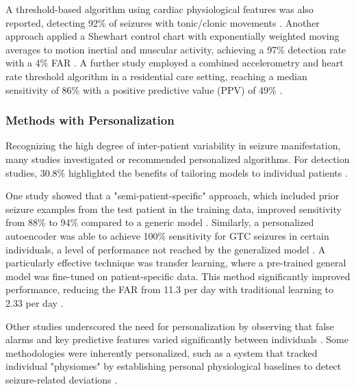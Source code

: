 A threshold-based algorithm using cardiac physiological features was also reported, detecting 92\% of seizures with tonic/clonic movements \cite{Hegarty-Craver2021-hk}. Another approach applied a Shewhart control chart with exponentially weighted moving averages to motion inertial and muscular activity, achieving a 97\% detection rate with a 4\% FAR \cite{Gheryani2017-yg}. A further study employed a combined accelerometry and heart rate threshold algorithm in a residential care setting, reaching a median sensitivity of 86\% with a positive predictive value (PPV) of 49\% \cite{Arends2018-ew}.


\subsubsection{Methods with Personalization}
Recognizing the high degree of inter-patient variability in seizure manifestation, many studies investigated or recommended personalized algorithms. For detection studies, 30.8\% highlighted the benefits of tailoring models to individual patients \cite{Yu2023-ss, Poh2012-af, Nasseri2021-xn, Milosevic2016-ee, Hamlin2021-sd, Jiang2022-zu, Hegarty-Craver2021-hk, Wang2025-ql}.

One study showed that a "semi-patient-specific" approach, which included prior seizure examples from the test patient in the training data, improved sensitivity from 88\% to 94\% compared to a generic model \cite{Poh2012-af}. Similarly, a personalized autoencoder was able to achieve 100\% sensitivity for GTC seizures in certain individuals, a level of performance not reached by the generalized model \cite{Yu2023-ss}. A particularly effective technique was transfer learning, where a pre-trained general model was fine-tuned on patient-specific data. This method significantly improved performance, reducing the FAR from 11.3 per day with traditional learning to 2.33 per day \cite{Nasseri2021-xn}.

Other studies underscored the need for personalization by observing that false alarms and key predictive features varied significantly between individuals \cite{Milosevic2016-ee, Hamlin2021-sd}. Some methodologies were inherently personalized, such as a system that tracked individual "physiomes" by establishing personal physiological baselines to detect seizure-related deviations \cite{Jiang2022-zu}.